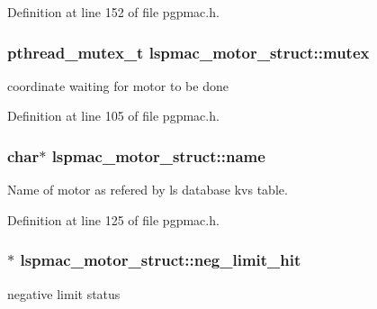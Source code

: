 Definition at line 152 of file pgpmac.\-h.

\hypertarget{structlspmac__motor__struct_a188c5b1e991750ce2ffd53e0192e0907}{
\subsubsection[{mutex}]{\setlength{\rightskip}{0pt plus 5cm}pthread\-\_\-mutex\-\_\-t lspmac\-\_\-motor\-\_\-struct\-::mutex}}\label{structlspmac__motor__struct_a188c5b1e991750ce2ffd53e0192e0907}


coordinate waiting for motor to be done 



Definition at line 105 of file pgpmac.\-h.

\hypertarget{structlspmac__motor__struct_aa90af2f6f1489f1befe1d0891e51575a}{
\subsubsection[{name}]{\setlength{\rightskip}{0pt plus 5cm}char$\ast$ lspmac\-\_\-motor\-\_\-struct\-::name}}\label{structlspmac__motor__struct_aa90af2f6f1489f1befe1d0891e51575a}


Name of motor as refered by ls database kvs table. 



Definition at line 125 of file pgpmac.\-h.

\hypertarget{structlspmac__motor__struct_afe13c86941928d20357f4f3e2a4d915a}{
\subsubsection[{neg\-\_\-limit\-\_\-hit}]{$\ast$ lspmac\-\_\-motor\-\_\-struct\-::neg\-\_\-limit\-\_\-hit}}\label{structlspmac__motor__struct_afe13c86941928d20357f4f3e2a4d915a}


negative limit status 



